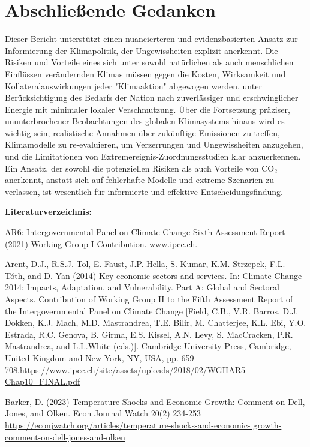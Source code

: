 \documentclass[12pt,paper=a4,DIV=12,parskip=never,chapterprefix=false,headings=standardclasses]{scrreprt}
\begin{document}
\section{Abschließende Gedanken}
Dieser Bericht unterstützt einen nuancierteren und evidenzbasierten Ansatz zur Informierung der Klimapolitik, der Ungewissheiten explizit anerkennt. Die Risiken und Vorteile eines sich unter sowohl natürlichen als auch menschlichen Einflüssen verändernden Klimas müssen gegen die Kosten, Wirksamkeit und Kollateralauswirkungen jeder "Klimaaktion" abgewogen werden, unter Berücksichtigung des Bedarfs der Nation nach zuverlässiger und erschwinglicher Energie mit minimaler lokaler Verschmutzung.
Über die Fortsetzung präziser, ununterbrochener Beobachtungen des globalen Klimasystems hinaus wird es wichtig sein, realistische Annahmen über zukünftige Emissionen zu treffen, Klimamodelle zu re-evaluieren, um Verzerrungen und Ungewissheiten anzugehen, und die Limitationen von Extremereignis-Zuordnungsstudien klar anzuerkennen. Ein Ansatz, der sowohl die potenziellen Risiken als auch Vorteile von CO$_2$ anerkennt, anstatt sich auf fehlerhafte Modelle und extreme Szenarien zu verlassen, ist wesentlich für informierte und effektive Entscheidungsfindung.

\vfill
\noindent\textbf{Literaturverzeichnis:}

\begingroup
\parindent=0pt
\everypar{\hangindent=2em\hangafter=1\relax}

AR6: Intergovernmental Panel on Climate Change Sixth Assessment Report (2021) Working Group I
Contribution. \url{www.ipcc.ch.}

Arent, D.J., R.S.J. Tol, E. Faust, J.P. Hella, S. Kumar, K.M. Strzepek, F.L. Tóth, and D. Yan (2014) Key
economic sectors and services. In: Climate Change 2014: Impacts, Adaptation, and Vulnerability. Part
A: Global and Sectoral Aspects. Contribution of Working Group II to the Fifth Assessment Report of
the Intergovernmental Panel on Climate Change [Field, C.B., V.R. Barros, D.J. Dokken, K.J. Mach,
M.D. Mastrandrea, T.E. Bilir, M. Chatterjee, K.L. Ebi, Y.O. Estrada, R.C. Genova, B. Girma, E.S.
Kissel, A.N. Levy, S. MacCracken, P.R. Mastrandrea, and L.L.White (eds.)]. Cambridge University
Press, Cambridge, United Kingdom and New York, NY, USA, pp. 659-
708.\url{https://www.ipcc.ch/site/assets/uploads/2018/02/WGIIAR5-Chap10_FINAL.pdf}

Barker, D. (2023) Temperature Shocks and Economic Growth: Comment on Dell, Jones, and Olken. Econ
Journal Watch 20(2) 234-253 \url{https://econjwatch.org/articles/temperature-shocks-and-economic-
growth-comment-on-dell-jones-and-olken}
\end{document}
